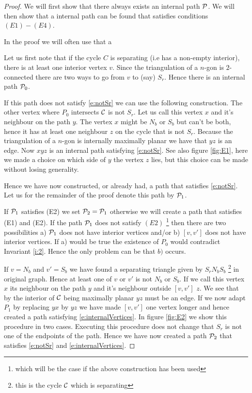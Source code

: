 \documentclass[a4paper]{article}
\theoremstyle{definition}
\begin{document}
\begin{proof}
We will first show that there always exists an internal path $\P$. We will then show that a internal path can be found that satisfies conditions $(E1) - (E4)$.

In the proof we will often use that a 

Let us first note that if the cycle $C$ is separating (i.e has a non-empty interior), there is at least one interior vertex $v$. Since the triangulation of a $n$-gon is $2$-connected there are two ways to go from $v$ to (say) $S_r$. Hence there is an internal path $\P_0$.

If this path does not satisfy \ref{e:notSr} we can use the following construction. The other vertex where $P_0$ intersects $\C$ is not $S_r$. Let us call this vertex $x$ and it's neighbour on the path $y$. The vertex $x$ might be $N_b$ or $S_b$ but can't be both, hence it has at least one neighbour $z$ on the cycle that is not $S_r$. Because the triangulation of a $n$-gon is internally maximally planar we have that $yz$ is an edge. Now $xyz$ is an internal path satisfying \ref{e:notSr}. See also figure \ref{fig:E1}, here we made a choice on which side of $y$ the vertex $z$ lies, but this choice can be made without losing generality.

Hence we have now constructed, or already had, a path that satisfies \ref{e:notSr}. Let us for the remainder of the proof denote this path by $\P_1$.


If $\P_1$ satisfies (E2) we set $\P_2 = \P_1$ otherwise we will create a path that satisfies (E1) and (E2). 
If the path $\P_1$ does not satisfy $(E2)$ \footnote{which will be the case if the above construction has been used} then there are two possibilities  a) $\P_1$ does not have interior vertices and/or b) $[v,v']$ does not have interior vertices. If a) would be true the existence of $P_0$ would contradict Invariant \ref{i:2}. Hence the only problem can be that $b)$ occurs. 

If $v=N_b$ and $v'=S_b$ we have found a separating triangle given by $S_rN_bS_b$ \footnote{this is the cycle $\C$ which is separating} in original graph. Hence at least one of $v$ or $v'$ is not $N_b$ or $S_b$. If we call this vertex $x$ its neighbour on the path $y$ and it's neighbour outside $[v,v']$ $z$. We see that by the interior of $\C$ being maximally planar $yz$ must be an edge. If we now adapt $P_1$ by replacing $yx$ by $yz$ we have made $[v,v']$ one vertex longer and hence created a path satisfying \ref{e:internalVertices}. In figure \ref{fig:E2} we show this procedure in two cases. Executing this procedure does not change that $S_r$ is not one of the endpoints of the path. Hence we have now created a path $\P_2$ that satisfies \ref{e:notSr} and \ref{e:internalVertices}.


\end{proof}
\end{document}
